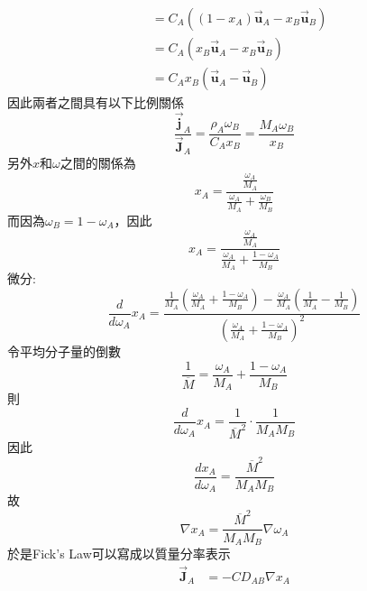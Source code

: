 \documentclass[../main.tex]{subfiles}
\begin{document}
\begin{itemize}
\begin{itemize}
\begin{align}
      &= C_A \left(
        (1-x_A) \vec{\bm u}_A - x_B \vec{\bm u}_B
      \right) \nonumber\\
      &= C_A \left(
        x_B \vec{\bm u}_A - x_B \vec{\bm u}_B
      \right) \nonumber\\
      &= C_A x_B \left(
        \vec{\bm u}_A - \vec{\bm u}_B
      \right)
    \end{align}
    因此兩者之間具有以下比例關係
    \begin{equation}
      \boxed{\frac{\vec{\bm j}_A}{\vec{\bm J}_A} = \frac{\rho_A \omega_B}{C_A x_B} = \frac{M_A \omega_B}{x_B}
      } \label{eq:molar_to_mass_diffusion_flux}
    \end{equation}
    另外$x$和$\omega$之間的關係為
    \begin{equation}
      x_A = \frac{\frac{\omega_A}{M_A}}{\frac{\omega_A}{M_A} + \frac{\omega_B}{M_B}}
    \end{equation}
    而因為$\omega_B = 1 - \omega_A$，因此
    \begin{equation}
      x_A = \frac{\frac{\omega_A}{M_A}}{\frac{\omega_A}{M_A} + \frac{1-\omega_A}{M_B}}
    \end{equation}
    微分:
    \begin{equation}
      \frac{d}{d\omega_A} x_A =\frac{
        \frac{1}{M_A} \left(
          \frac{\omega_A}{M_A} + \frac{1-\omega_A}{M_B}
        \right) - \frac{\omega_A}{M_A} \left(
          \frac{1}{M_A} - \frac{1}{M_B}
        \right)
      }{\left(
        \frac{\omega_A}{M_A} + \frac{1-\omega_A}{M_B}
      \right)^2}
    \end{equation}
  令平均分子量的倒數
  \begin{equation}
    \frac{1}{\overline{M}} = \frac{\omega_A}{M_A} + \frac{1-\omega_A}{M_B}
  \end{equation}
  則
  \begin{equation}
    \frac{d}{d\omega_A} x_A = \frac{1}{\overline{M}^2} \cdot \frac{1}{M_A M_B}
  \end{equation}
  因此
  \begin{equation}
    \frac{d x_A}{d \omega_A} = \frac{\overline{M}^2}{M_A M_B} \label{eq:dxA_domegaA}
  \end{equation}
  故
  \begin{equation}
    \nabla x_A = \frac{\overline{M}^2}{M_A M_B} \nabla \omega_A \label{eq:grad_xA_to_grad_omegaA}
  \end{equation}
  於是Fick's Law可以寫成以質量分率表示
  \begin{align}
    \vec{\bm J}_A &= - C D_{AB} \nabla x_A \nonumber\\

\end{align}
\end{itemize}
\end{itemize}
\end{document}
